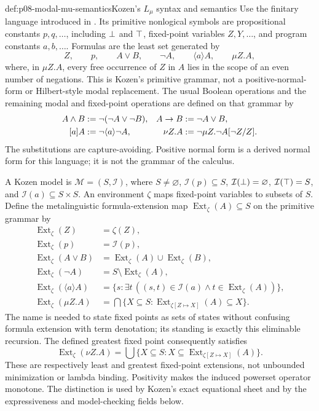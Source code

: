 \begin{hbdefinition}{def:p08-modal-mu-semantics}{Kozen's \(L_{\mu}\) syntax and semantics}
Use the finitary language introduced in \textcite{Kozen1983}.  Its primitive
nonlogical symbols are propositional constants \(p,q,\ldots\), including
\(\bot\) and \(\top\), fixed-point variables \(Z,Y,\ldots\), and program
constants \(a,b,\ldots\).  Formulas are the least set generated by
\[
 Z,\qquad p,\qquad A\lor B,\qquad \neg A,\qquad
 \langle a\rangle A,\qquad \mu Z.A,
\]
where, in \(\mu Z.A\), every free occurrence of \(Z\) in \(A\) lies in the
scope of an even number of negations.  This is Kozen's primitive grammar, not
a positive-normal-form or Hilbert-style modal replacement.  The
usual Boolean operations and the remaining modal and fixed-point operations
are defined on that grammar by
\[
 \begin{aligned}
 A\land B&\mathrel{:=}\neg(\neg A\lor\neg B),
 & A\to B&\mathrel{:=}\neg A\lor B,\\
 [a]A&\mathrel{:=}\neg\langle a\rangle\neg A,
 & \nu Z.A&\mathrel{:=}\neg\mu Z.\neg A[\neg Z/Z].
 \end{aligned}
\]
The substitutions are capture-avoiding.  Positive normal form is a derived
normal form for this language; it is not the grammar of the calculus.

A Kozen model is \(\mathcal M=(S,\mathcal I)\), where \(S\ne\varnothing\),
\(\mathcal I(p)\subseteq S\), \(\mathcal I(\bot)=\varnothing\),
\(\mathcal I(\top)=S\), and
\(\mathcal I(a)\subseteq S\times S\).  An environment \(\zeta\) maps
fixed-point variables to subsets of \(S\).  Define the metalinguistic
formula-extension map \(\operatorname{Ext}_{\zeta}(A)\subseteq S\) on the
primitive grammar by
\[
\begin{aligned}
 \operatorname{Ext}_{\zeta}(Z)&=\zeta(Z),\\
 \operatorname{Ext}_{\zeta}(p)&=\mathcal I(p),\\
 \operatorname{Ext}_{\zeta}(A\lor B)&=
   \operatorname{Ext}_{\zeta}(A)\cup\operatorname{Ext}_{\zeta}(B),\\
 \operatorname{Ext}_{\zeta}(\neg A)&=
   S\setminus\operatorname{Ext}_{\zeta}(A),\\
 \operatorname{Ext}_{\zeta}(\langle a\rangle A)&=
   \{s:\exists t\,((s,t)\in\mathcal I(a)\land
      t\in\operatorname{Ext}_{\zeta}(A))\},\\
 \operatorname{Ext}_{\zeta}(\mu Z.A)
 &=\bigcap\{X\subseteq S:
     \operatorname{Ext}_{\zeta[Z\mapsto X]}(A)\subseteq X\}.
\end{aligned}
\]
The name is needed to state fixed points as sets of states without confusing
formula extension with term denotation; its standing is exactly this
eliminable recursion.  The defined greatest fixed point consequently satisfies
\[
 \operatorname{Ext}_{\zeta}(\nu Z.A)
 =\bigcup\{X\subseteq S:
    X\subseteq\operatorname{Ext}_{\zeta[Z\mapsto X]}(A)\}.
\]
These are respectively least and greatest fixed-point extensions, not
unbounded minimization or lambda binding.  Positivity makes the induced
powerset operator monotone.  The distinction is used by Kozen's exact
equational sheet and by the expressiveness and model-checking fields below.
\end{hbdefinition}

